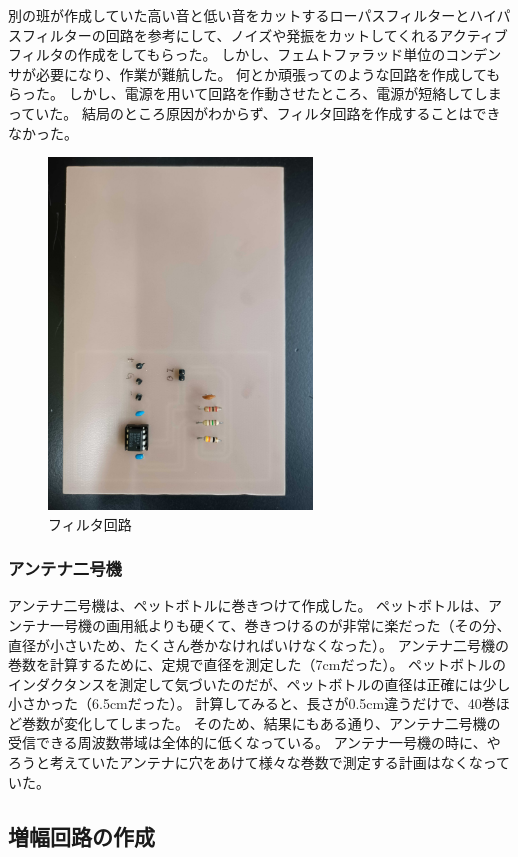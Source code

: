 \documentclass[report.tex]{subfiles}
\begin{document}
別の班が作成していた高い音と低い音をカットするローパスフィルターとハイパスフィルターの回路を参考にして、ノイズや発振をカットしてくれるアクティブフィルタの作成をしてもらった。
しかし、フェムトファラッド単位のコンデンサが必要になり、作業が難航した。
何とか頑張ってのような回路を作成してもらった。
しかし、電源を用いて回路を作動させたところ、電源が短絡してしまっていた。
結局のところ原因がわからず、フィルタ回路を作成することはできなかった。

\begin{figure}[H]
	\centering
	\includegraphics[width=7cm]{use/1.jpg}
	\caption{フィルタ回路}
	\label{fig:filter}
\end{figure}

\subsubsection{アンテナ二号機}

アンテナ二号機は、ペットボトルに巻きつけて作成した。
ペットボトルは、アンテナ一号機の画用紙よりも硬くて、巻きつけるのが非常に楽だった（その分、直径が小さいため、たくさん巻かなければいけなくなった）。
アンテナ二号機の巻数を計算するために、定規で直径を測定した（7cmだった）。
ペットボトルのインダクタンスを測定して気づいたのだが、ペットボトルの直径は正確には少し小さかった（6.5cmだった）。
計算してみると、長さが0.5cm違うだけで、40巻ほど巻数が変化してしまった。
そのため、結果にもある通り、アンテナ二号機の受信できる周波数帯域は全体的に低くなっている。
アンテナ一号機の時に、やろうと考えていたアンテナに穴をあけて様々な巻数で測定する計画はなくなっていた。

\subsection{増幅回路の作成}
\end{document}
